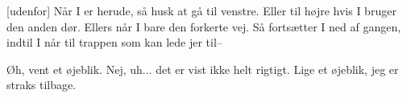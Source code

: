 \documentclass[a4paper,11pt]{article}
\begin{document}
\begin{sketch}

[udenfor] Når I er herude, så husk at gå til venstre.  Eller til højre hvis I bruger den anden dør.  Ellers når I bare den forkerte vej.  Så fortsætter I ned af gangen, indtil I når til trappen som kan lede jer til--


 Øh, vent et øjeblik.  Nej, uh... det er vist ikke helt rigtigt.  Lige et øjeblik, jeg er straks tilbage.


 \end{sketch}
\end{document}
